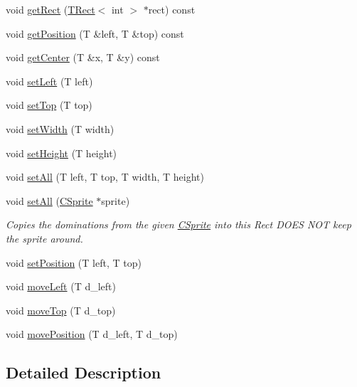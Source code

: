 \begin{DoxyCompactItemize}
\item 
void \hyperlink{classengine_1_1TRect_a9b563983bf2839c51db741cdd0b90058}{get\-Rect} (\hyperlink{classengine_1_1TRect}{T\-Rect}$<$ int $>$ $\ast$rect) const 
\item 
void \hyperlink{classengine_1_1TRect_a6ec7dc08118c6012d17327ca8934d2e0}{get\-Position} (T \&left, T \&top) const 
\item 
void \hyperlink{classengine_1_1TRect_a34c390356af6890b4d4a5ef3d19694cf}{get\-Center} (T \&x, T \&y) const 
\item 
void \hyperlink{classengine_1_1TRect_aa0f1c4e8042c553fb3a9ad0805a58bb3}{set\-Left} (T left)
\item 
void \hyperlink{classengine_1_1TRect_aca4664e0e6d9736ffbc48663f9e8cd3f}{set\-Top} (T top)
\item 
void \hyperlink{classengine_1_1TRect_aad5a2530169d7953634fea4515381c37}{set\-Width} (T width)
\item 
void \hyperlink{classengine_1_1TRect_ae29fe9d2401f49e84f6c070ef60e9d7b}{set\-Height} (T height)
\item 
void \hyperlink{classengine_1_1TRect_ae10bacc96b54c45b2722e51b045ae3fe}{set\-All} (T left, T top, T width, T height)
\item 
void \hyperlink{classengine_1_1TRect_a41cce51fffc829c4d3e5dc40f605cb9e}{set\-All} (\hyperlink{classCSprite}{C\-Sprite} $\ast$sprite)
\begin{DoxyCompactList}\small\item\em Copies the dominations from the given \hyperlink{classCSprite}{C\-Sprite} into this Rect D\-O\-E\-S N\-O\-T keep the sprite around. \end{DoxyCompactList}\item 
void \hyperlink{classengine_1_1TRect_ad7bdff230a7152e3d8ed3934046bed7c}{set\-Position} (T left, T top)
\item 
void \hyperlink{classengine_1_1TRect_a0699fb896f494a85e24abe32066ae5d9}{move\-Left} (T d\-\_\-left)
\item 
void \hyperlink{classengine_1_1TRect_a7e65ccfa166f4d7690d87e6985182379}{move\-Top} (T d\-\_\-top)
\item 
void \hyperlink{classengine_1_1TRect_a2650390138117e0ad1eecc8124735bd9}{move\-Position} (T d\-\_\-left, T d\-\_\-top)
\end{DoxyCompactItemize}


\subsection{Detailed Description}
